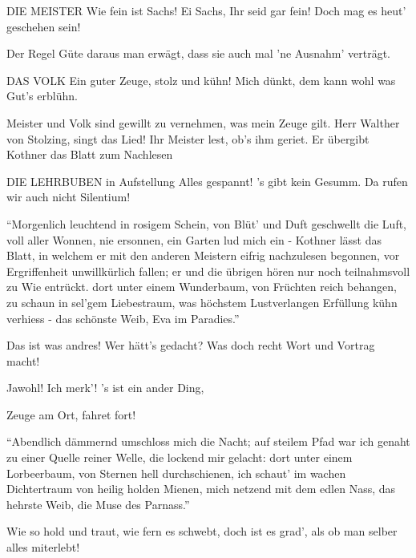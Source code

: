 \begin{drama}
DIE MEISTER
Wie fein ist Sachs! Ei Sachs, Ihr seid gar fein!
Doch mag es heut' geschehen sein!

\Sachsspeaks
Der Regel Güte daraus man erwägt,
dass sie auch mal 'ne Ausnahm' verträgt.

DAS VOLK
Ein guter Zeuge, stolz und kühn!
Mich dünkt, dem kann wohl was Gut's erblühn.

\Sachsspeaks
Meister und Volk sind gewillt
zu vernehmen, was mein Zeuge gilt.
Herr Walther von Stolzing, singt das Lied!
Ihr Meister lest, ob's ihm geriet.
Er übergibt Kothner das Blatt zum Nachlesen

DIE LEHRBUBEN
in Aufstellung
Alles gespannt! 's gibt kein Gesumm.
Da rufen wir auch nicht Silentium!

\Waltherspeaks
{}

``Morgenlich leuchtend in rosigem Schein,
von Blüt' und Duft geschwellt die Luft,
voll aller Wonnen, nie ersonnen,
ein Garten lud mich ein -
Kothner lässt das Blatt, in welchem er mit den anderen Meistern eifrig nachzulesen begonnen, vor Ergriffenheit unwillkürlich fallen; er und die übrigen hören nur noch teilnahmsvoll zu
Wie entrückt.
dort unter einem Wunderbaum,
von Früchten reich behangen,
zu schaun in sel'gem Liebestraum,
was höchstem Lustverlangen
Erfüllung kühn verhiess -
das schönste Weib, Eva im Paradies.''


Das ist was andres! Wer hätt's gedacht?
Was doch recht Wort und Vortrag macht!


Jawohl! Ich merk'! 's ist ein ander Ding,

\Sachsspeaks
Zeuge am Ort, fahret fort!

\Waltherspeaks
``Abendlich dämmernd umschloss mich die Nacht;
auf steilem Pfad war ich genaht
zu einer Quelle reiner Welle,
die lockend mir gelacht:
dort unter einem Lorbeerbaum,
von Sternen hell durchschienen,
ich schaut' im wachen Dichtertraum
von heilig holden Mienen,
mich netzend mit dem edlen Nass,
das hehrste Weib,
die Muse des Parnass.''


Wie so hold und traut, wie fern es schwebt,
doch ist es grad', als ob man selber alles miterlebt!



\end{drama}
